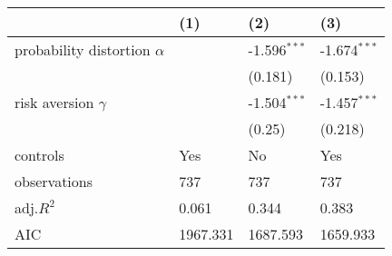 \begin{tabular}{llll}
\hline
 & (1) & (2) & (3) \\
\hline
probability distortion $\alpha$ &  & -1.596$^{***}$ & -1.674$^{***}$ \\
 &  & (0.181) & (0.153) \\
risk aversion $\gamma$ &  & -1.504$^{***}$ & -1.457$^{***}$ \\
 &  & (0.25) & (0.218) \\
controls & Yes & No & Yes \\
observations & 737 & 737 & 737 \\
adj.$R^2$ & 0.061 & 0.344 & 0.383 \\
AIC & 1967.331 & 1687.593 & 1659.933 \\
\hline
\end{tabular}
